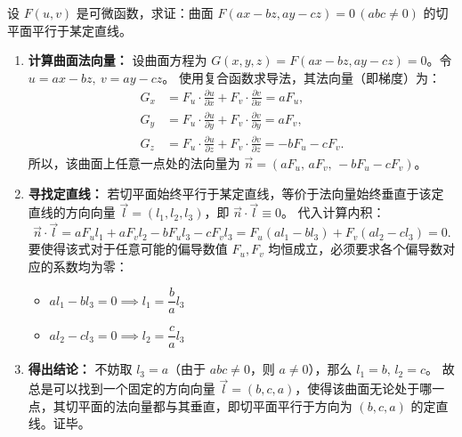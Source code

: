 \documentclass[lang=cn,11pt]{elegantbook}
\begin{document}
\begin{exercise}[抽象曲面切平面的几何特性推导]
设 $F(u,v)$ 是可微函数，求证：曲面 $F(ax-bz,ay-cz)=0\,(abc\neq 0)$ 的切平面平行于某定直线。
\end{exercise}
\begin{solution}
\begin{enumerate}
    \item \textbf{计算曲面法向量：}
    设曲面方程为 $G(x,y,z) = F(ax-bz, ay-cz) = 0$。令 $u = ax-bz,\ v = ay-cz$。
    使用复合函数求导法，其法向量（即梯度）为：
    \begin{align*}
    G_x &= F_u \cdot \frac{\partial u}{\partial x} + F_v \cdot \frac{\partial v}{\partial x} = a F_u, \\
    G_y &= F_u \cdot \frac{\partial u}{\partial y} + F_v \cdot \frac{\partial v}{\partial y} = a F_v, \\
    G_z &= F_u \cdot \frac{\partial u}{\partial z} + F_v \cdot \frac{\partial v}{\partial z} = -b F_u - c F_v.
    \end{align*}
    所以，该曲面上任意一点处的法向量为 $\vec{n} = (a F_u,\, a F_v,\, -b F_u - c F_v)$。

    \item \textbf{寻找定直线：}
    若切平面始终平行于某定直线，等价于法向量始终垂直于该定直线的方向向量 $\vec{l} = (l_1, l_2, l_3)$，即 $\vec{n} \cdot \vec{l} \equiv 0$。
    代入计算内积：
    \[ \vec{n} \cdot \vec{l} = a F_u l_1 + a F_v l_2 - b F_u l_3 - c F_v l_3 = F_u(a l_1 - b l_3) + F_v(a l_2 - c l_3) = 0. \]
    要使得该式对于任意可能的偏导数值 $F_u, F_v$ 均恒成立，必须要求各个偏导数对应的系数均为零：
    \begin{itemize}
        \item $a l_1 - b l_3 = 0 \implies l_1 = \dfrac{b}{a} l_3$
        \item $a l_2 - c l_3 = 0 \implies l_2 = \dfrac{c}{a} l_3$
    \end{itemize}

    \item \textbf{得出结论：}
    不妨取 $l_3 = a$（由于 $abc \neq 0$，则 $a \neq 0$），那么 $l_1 = b,\, l_2 = c$。
    故总是可以找到一个固定的方向向量 $\vec{l} = (b, c, a)$，使得该曲面无论处于哪一点，其切平面的法向量都与其垂直，即切平面平行于方向为 $(b, c, a)$ 的定直线。证毕。
\end{enumerate}
\end{solution}





\end{document}
